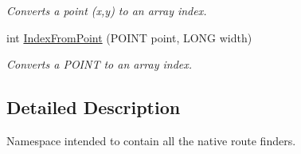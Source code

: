 \begin{DoxyCompactItemize}
$$\begin{DoxyCompactList}\small\item\em Converts a point (x,y) to an array index. \end{DoxyCompactList}\item 
int \hyperlink{namespace_native_route_finders_a1ac7914f291e541d22436ba8b2f6d373}{Index\-From\-Point} (P\-O\-I\-N\-T point, L\-O\-N\-G width)
\begin{DoxyCompactList}\small\item\em Converts a P\-O\-I\-N\-T to an array index. \end{DoxyCompactList}\end{DoxyCompactItemize}


\subsection{Detailed Description}
Namespace intended to contain all the native route finders. 

